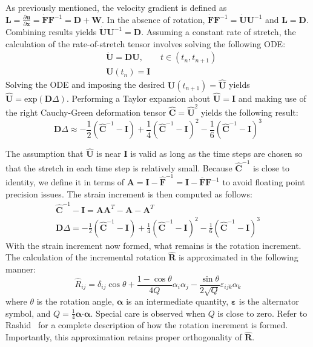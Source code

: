 As previously mentioned, the velocity gradient is defined as $\bm{L} = \frac{\partial \bm{u}}{\partial \bm{x}} = \dot{\bm{F}}\bm{F}^{-1} = \bm{D} + \bm{W}$. In the absence of rotation, $\dot{\bm{F}}\bm{F}^{-1} = \dot{\bm{U}}\bm{U}^{-1}$ and $\bm{L} = \bm{D}$. Combining results yields $\dot{\bm{U}}\bm{U}^{-1} = \bm{D}$. Assuming a constant rate of stretch, the calculation of the rate-of-stretch tensor involves solving the following ODE:
\begin{align}
&\dot{{\bm{U}}} = {\bm{D}}{\bm{U}}, \qquad t\in (t_n, t_{n+1}) \\
&{\bm{U}}\left(t_n\right) = \bm{I}
\end{align}
Solving the ODE and imposing the desired ${\bm{U}}(t_{n+1}) = \hat{\bm{U}}$ yields $\hat{\bm{U}} = \text{exp}(\bm{D}\Delta)$. Performing a Taylor expansion about $\hat{\bm{U}} = \bm{I}$ and making use of the right Cauchy-Green deformation tensor $\hat{\bm{C}} = \hat{\bm{U}}^2$ yields the following result: 
\begin{equation}
{\bm{D}}\Delta \approx -\frac{1}{2}(\hat{\bm C}^{-1} - {\bm{I}})+ \frac{1}{4} (\hat{\bm{C}}^{-1} - {\bm{I}})^{2} - \frac{1}{6} (\hat{\bm{C}}^{-1} - {\bm{I}})^{3}
\end{equation}

The assumption that $\hat{\bm{U}}$ is near $\bm{I}$ is valid as long as the time steps are chosen so that the stretch in each time step is relatively small. Because $\hat{\bm{C}}^{-1}$ is close to identity, we define it in terms of $\bm{A} = \bm{I} - \hat{\bm{F}}^{-1} = \bm{I} - \overline{\bm{F}}\bm{F}^{-1}$ to avoid floating point precision issues. The strain increment is then computed as follows:
\begin{gather}
\hat{\bm C}^{-1} - {\bm I} = \bm{A} \bm{A}^T - \bm{A} - \bm{A}^T \\
{\bm D}\Delta = -\frac{1}{2}(\hat{\bm C}^{-1} - {\bm I})+ \frac{1}{4} (\hat{\bm C}^{-1} - {\bm I})^{2} - \frac{1}{6} (\hat{\bm C}^{-1} - {\bm I})^{3}
\end{gather}
With the strain increment now formed, what remains is the rotation increment. The calculation of the incremental rotation $\hat{\bm{R}}$ is approximated in the following manner:
\begin{equation}
\hat{R}_{ij} = \delta_{ij}\cos\theta + \frac{1 - \cos \theta}{4Q}\alpha_i\alpha_j - \frac{\sin\theta}{2\sqrt{Q}}\varepsilon_{ijk}\alpha_{k}
\end{equation}
where $\theta$ is the rotation angle, $\boldsymbol{\alpha}$ is an intermediate quantity, $\boldsymbol{\varepsilon}$ is the alternator symbol, and $Q  =\frac{1}{4}\bm{\alpha} \bm{\cdot} \bm{\alpha}$. Special care is observed when $Q$ is close to zero. Refer to Rashid~\cite{rashid_1993} for a complete description of how the rotation increment is formed. Importantly, this approximation retains proper orthogonality of $\hat{\bm{R}}$.

